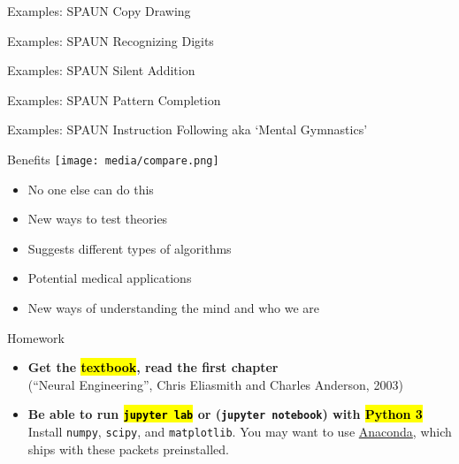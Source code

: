 \documentclass[handout,aspectratio=169]{beamer}
\begin{document}
\begin{frame}{Examples: SPAUN Copy Drawing}
	\centering
\end{frame}

\begin{frame}{Examples: SPAUN Recognizing Digits}
	\centering
\end{frame}

\begin{frame}{Examples: SPAUN Silent Addition}
	\centering
\end{frame}

\begin{frame}{Examples: SPAUN Pattern Completion}
	\centering
\end{frame}

\begin{frame}{Examples: SPAUN Instruction Following aka `Mental Gymnastics'}
	\centering
\end{frame}

\begin{frame}{Benefits}
	\centering
	\vspace{0.25cm}
	\texttt{[image: media/compare.png]}
	\begin{multicols}{2}
	\begin{itemize}		
		\setlength\itemsep{0.25cm}
		\item No one else can do this
		\item New ways to test theories
		\item Suggests different types of algorithms
		\item Potential medical applications
		\item New ways of understanding the mind and who we are		
	\end{itemize}
	\end{multicols}
\end{frame}

\begin{frame}{Homework}
	\begin{itemize}
		\setlength{\itemsep}{0.5cm}
		\item \textbf{Get the \hl{textbook}, read the first chapter}\\
		(\enquote{Neural Engineering}, Chris Eliasmith and Charles Anderson, 2003)
		\item \textbf{Be able to run \hl{\texttt{jupyter lab}} or (\texttt{jupyter notebook}) with \hl{Python 3}}\\
		Install \texttt{numpy}, \texttt{scipy}, and \texttt{matplotlib}. You may want to use \href{https://www.anaconda.com/distribution/}{Anaconda}, which ships with these packets preinstalled.
	\end{itemize}
\end{frame}
\end{document}
